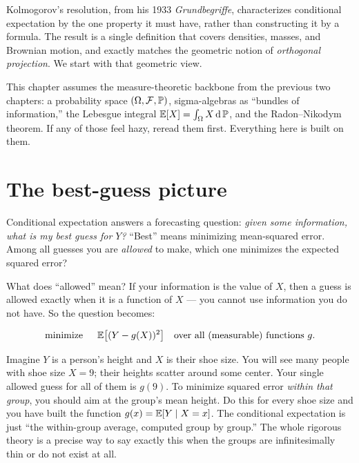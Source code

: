 Kolmogorov's resolution, from his 1933 \emph{Grundbegriffe}, characterizes conditional expectation by the one property it must have, rather than constructing it by a formula. The result is a single definition that covers densities, masses, and Brownian motion, and exactly matches the geometric notion of \emph{orthogonal projection}. We start with that geometric view.

\begin{focusbox}
This chapter assumes the measure-theoretic backbone from the previous two chapters: a probability
space $(\Omega, \mathcal{F}, \P)$, sigma-algebras as ``bundles of information,'' the Lebesgue
integral $\E[X] = \int_\Omega X \,\dd\P$, and the Radon--Nikodym theorem. If any of those feel hazy,
reread them first. Everything here is built on them.
\end{focusbox}

\section{The best-guess picture}
\label{ch38:best-guess}

Conditional expectation answers a forecasting question: \emph{given
some information, what is my best guess for $Y$?} ``Best'' means minimizing mean-squared error.
Among all guesses you are \emph{allowed} to make, which one minimizes
the expected squared error?

What does ``allowed'' mean? If your information is the value of $X$, then a guess is allowed exactly
when it is a function of $X$ --- you cannot use information you do not have. So the question becomes:

\begin{equation}
\label{ch38:l2-problem}
  \text{minimize } \quad \E\!\big[(Y - g(X))^2\big] \quad \text{over all (measurable) functions } g.
\end{equation}

\begin{intuitionbox}
Imagine $Y$ is a person's height and $X$ is their shoe size. You will see many people with shoe size
$X = 9$; their heights scatter around some center. Your single allowed guess for all of them is
$g(9)$. To minimize squared error \emph{within that group}, you should aim at the group's mean
height. Do this for every shoe size and you have built the function $g(x) = \E[Y \given X = x]$. The
conditional expectation is just ``the within-group average, computed group by group.'' The whole
rigorous theory is a precise way to say exactly this when the groups are infinitesimally thin or do
not exist at all.
\end{intuitionbox}

